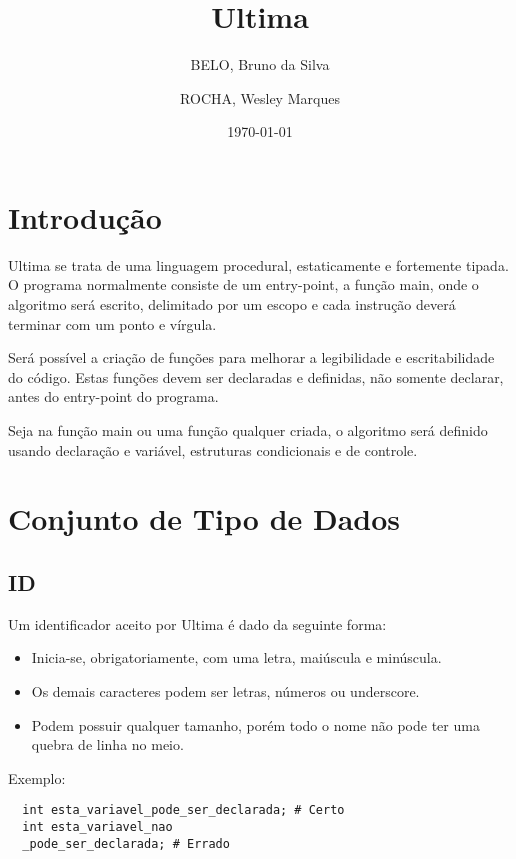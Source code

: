 \documentclass[a4paper, 11pt, article]{memoir}
\title{Ultima}
\author{BELO, Bruno da Silva \and ROCHA, Wesley Marques}
\date{\today}
\begin{document}
\frontmatter
\begin{titlingpage}
  \maketitle
\end{titlingpage}

\tableofcontents

\mainmatter

\section{Introdução}
\label{sec:intro}
Ultima se trata de uma linguagem procedural, estaticamente e fortemente tipada.
O programa normalmente consiste de um entry-point, a função main, onde o
algoritmo será escrito, delimitado por um escopo e cada instrução deverá
terminar com um ponto e vírgula.

Será possível a criação de funções para melhorar a legibilidade e
escritabilidade do código. Estas funções devem ser declaradas e definidas, não
somente declarar, antes do entry-point do programa.

Seja na função main ou uma função qualquer criada, o algoritmo será definido
usando declaração e variável, estruturas condicionais e de controle.

\section{Conjunto de Tipo de Dados}
\label{sec:conjunto}

\subsection{ID}
\label{subsec:id}
Um identificador aceito por Ultima é dado da seguinte forma:
\begin{itemize}
\item Inicia-se, obrigatoriamente, com uma letra, maiúscula e minúscula.
\item Os demais caracteres podem ser letras, números ou underscore.
\item Podem possuir qualquer tamanho, porém todo o nome não pode ter uma quebra
  de linha no meio.
\end{itemize}

Exemplo:
\begin{lstlisting}
  int esta_variavel_pode_ser_declarada; # Certo
  int esta_variavel_nao
  _pode_ser_declarada; # Errado
\end{lstlisting}
\end{document}
